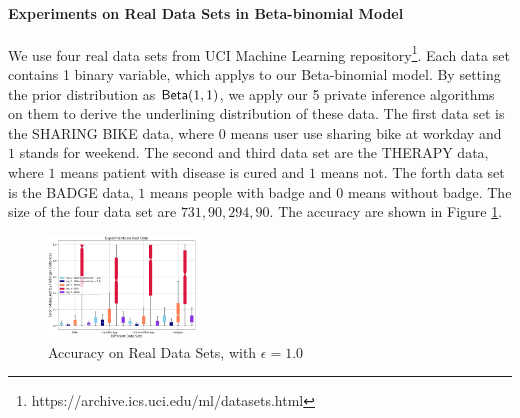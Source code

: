 \documentclass{article}
\begin{document}


\paragraph{Experiments on Real Data Sets in Beta-binomial Model}
We use four real data sets from UCI Machine Learning repository\footnote{https://archive.ics.uci.edu/ml/datasets.html}. Each data set contains 1 binary variable, which applys to our Beta-binomial model. By setting the prior distribution as $\mathsf{Beta}(1,1)$, we apply our 5 private inference algorithms on them to derive the underlining distribution of these data. The first data set is the SHARING BIKE data, where $0$ means user use sharing bike at workday and $1$ stands for weekend. The second and third data set are the THERAPY data, where $1$ means patient with disease is cured and $1$ means not. The forth data set is the BADGE data, $1$ means people with badge and $0$ means without badge. The size of the four data set are $731, 90, 294, 90$. The accuracy are shown in Figure \ref{fig_real_2d}.
\begin{figure}
\centering
\includegraphics[width=0.35\textwidth]{realdata.eps}
\caption{Accuracy on Real Data Sets, with $\epsilon = 1.0$}
\label{fig_real_2d}
\end{figure}
\end{document}
